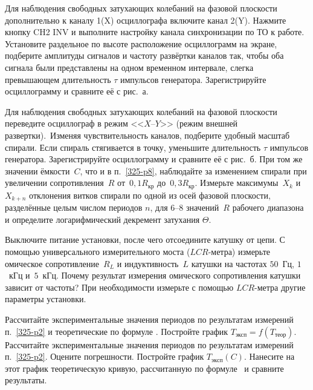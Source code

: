 \begin{lab:task}
\item Для наблюдения свободных затухающих колебаний на фазовой плоскости дополнительно 
к каналу 1(X) осциллографа включите канал 2(Y). Нажмите кнопку CH2 INV и выполните 
настройку канала синхронизации по ТО к работе. 
Установите раздельное по высоте расположение осциллограмм на экране, подберите 
амплитуды сигналов и частоту развёртки каналов так, чтобы оба сигнала были представлены 
на одном временном интервале, слегка превышающем длительность $\tau$ импульсов генератора. 
Зарегистрируйте осциллограмму и сравните её с рис.~а.

\item Для наблюдения свободных затухающих колебаний на фазовой плоскости переведите осциллограф 
в режим <<$X$--$Y$>> (режим внешней развертки). Изменяя чувствительность каналов, подберите 
удобный масштаб спирали. Если спираль стягивается в точку, уменьшите длительность $\tau$ импульсов 
генератора. Зарегистрируйте осциллограмму и сравните её с рис.~б. 
При том же значении ёмкости~$C$, что и в п.~\ref{325-p8}, наблюдайте за изменением спирали 
при увеличении сопротивления~$R$ от~$0,1R_{\text{кр}}$ до~$0,3R_{\text{кр}}$. 
Измерьте максимумы~$X_k$ и~$X_{k+n}$ отклонения витков спирали по 
одной из осей фазовой плоскости, разделённые целым числом периодов $n$, 
для $6$--$8$ значений~$R$ рабочего диапазона и определите логарифмический декремент 
затухания $\Theta$.

\item Выключите питание установки, после чего отсоедините катушку от цепи. 
С помощью универсального измерительного моста ($LCR$-метра) измерьте
омическое сопротивление~$R_L$ и индуктивность~$L$ катушки на частотах $50$~Гц,
$1$~кГц и~$5$~кГц. Почему результат измерения омического
сопротивления катушки зависит от частоты? При необходимости измерьте с помощью 
$LCR$-метра другие параметры установки.



	\item Рассчитайте экспериментальные значения периодов по результатам
измерений п.~\ref{325-p2} и теоретические по формуле . 
Постройте график $T_\text{эксп} = f(T_\text{теор})$.
Рассчитайте экспериментальные значения периодов по результатам
измерений п.~\ref{325-p2}. Оцените погрешности. 
Постройте график $T_{эксп}(C)$. Нанесите на этот график теоретическую кривую, 
рассчитанную по формуле~ и сравните результаты.


\end{lab:task}

